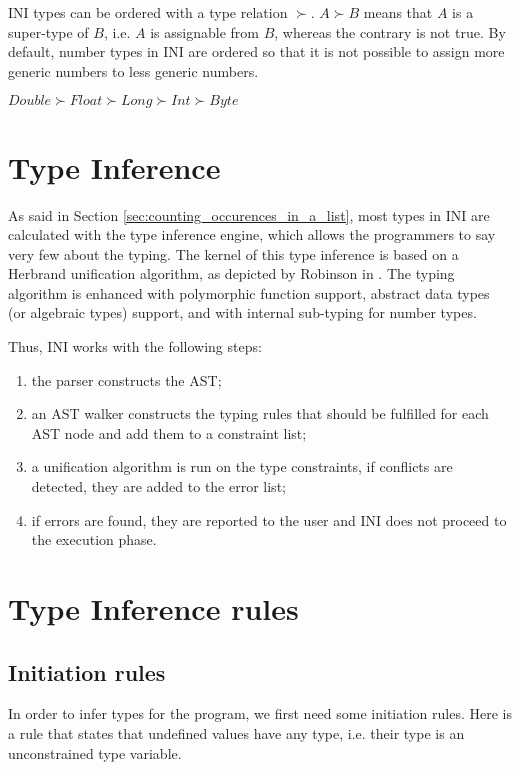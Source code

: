 \documentclass[11pt]{report}
\begin{document}
INI types can be ordered with a type relation $\succ$. $A \succ B$ means that $A$ is a super-type of $B$, i.e. $A$ is assignable from $B$, whereas the contrary is not true. By default, number types in INI are ordered so that it is not possible to assign more generic numbers to less generic numbers.

\begin{center}
$Double \succ Float \succ Long \succ Int \succ Byte$
\end{center}

\section{Type Inference}

As said in Section \ref{sec:counting_occurences_in_a_list}, most types in INI are calculated with the type inference engine, which allows the programmers to say very few about the typing. The kernel of this type inference is based on a Herbrand unification algorithm, as depicted by Robinson in \cite{robinson1965}. The typing algorithm is enhanced with polymorphic function support, abstract data types (or algebraic types) support, and with internal sub-typing for number types.

Thus, INI works with the following steps:

\begin{enumerate}
\item the parser constructs the AST;
\item an AST walker constructs the typing rules that should be fulfilled for each AST node and add them to a constraint list;
\item a unification algorithm is run on the type constraints, if conflicts are detected, they are added to the error list;
\item if errors are found, they are reported to the user and INI does not proceed to the execution phase.
\end{enumerate}

\section{Type Inference rules}

\subsection{Initiation rules}

In order to infer types for the program, we first need some initiation rules. Here is a rule that states that undefined values have any type, i.e. their type is an unconstrained type variable.
\end{document}
